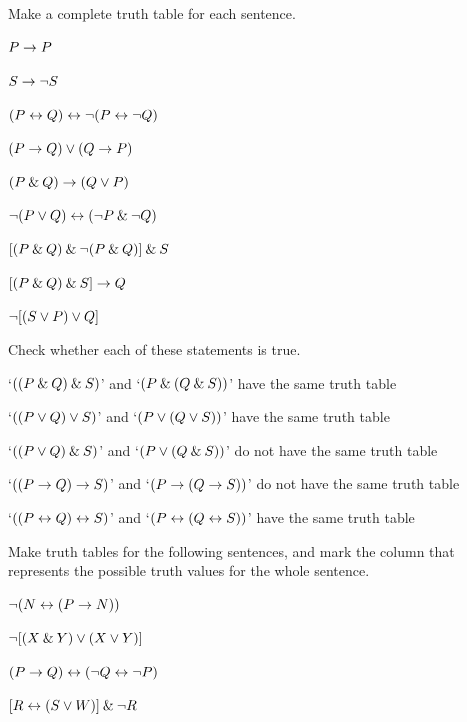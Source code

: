 \begin{small} 
\problempart
Make a complete truth table for each sentence.
\begin{earg}
\item $P \rightarrow P$ %
\item $S \rightarrow{\neg} S$ %
\item $(P \leftrightarrow Q) \leftrightarrow {\neg}(P\leftrightarrow {\neg} Q)$ %
\item $(P \rightarrow Q) \vee (Q \rightarrow P)$ %
\item $(P \mathbin{\&} Q) \rightarrow (Q \vee P)$  %
\item ${\neg}(P \vee Q) \leftrightarrow ({\neg} P \mathbin{\&} {\neg} Q)$ %
\item $[(P\mathbin{\&} Q) \mathbin{\&}{\neg}(P\mathbin{\&} Q)] \mathbin{\&} S$ %
\item $[(P \mathbin{\&} Q) \mathbin{\&} S] \rightarrow Q$ %
\item ${\neg}[(S\vee P) \vee Q]$ %
\end{earg}

\problempart
Check whether each of these statements is true.
\begin{earg}
	\item `$((P \mathbin{\&} Q) \mathbin{\&} S)$' and `$(P \mathbin{\&} (Q \mathbin{\&} S))$' have the same truth table
	\item `$((P \vee Q) \vee S)$' and `$(P \vee (Q \vee S))$' have the same truth table
	\item `$((P \vee Q) \mathbin{\&} S)$' and `$(P \vee (Q \mathbin{\&} S))$' do not have the same truth table
	\item `$((P \rightarrow Q) \rightarrow S)$' and `$(P \rightarrow (Q \rightarrow S))$' do not have the same truth table
	\item `$((P \leftrightarrow Q) \leftrightarrow S)$' and `$(P \leftrightarrow (Q \leftrightarrow S))$' have the same truth table
\end{earg}

\problempart
Make truth tables for the following sentences, and mark the column that represents the possible truth values for the whole sentence.

\begin{earg}

\item ${\neg} (N \leftrightarrow (P \rightarrow N))$

\item ${\neg} [(X \mathbin{\&} Y) \vee (X \vee Y)]$

\item $(P \rightarrow Q) \leftrightarrow ({\neg} Q\leftrightarrow {\neg} P)$

\item $[R \leftrightarrow (S \vee W)] \mathbin{\&} {\neg} R$


\end{earg}
\end{small}
